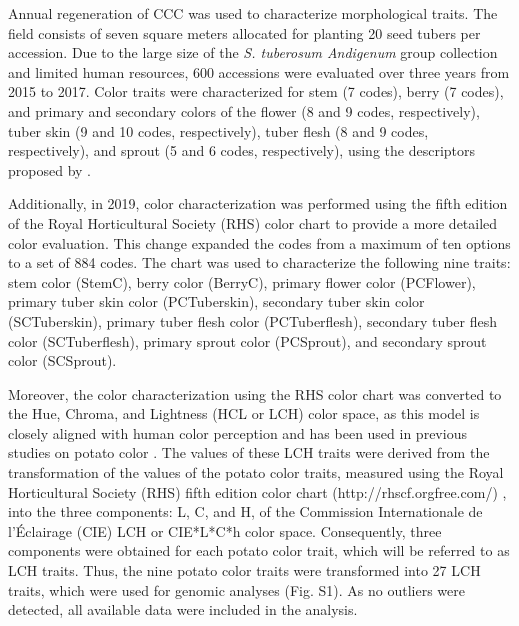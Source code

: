 \documentclass[pdflatex,sn-mathphys-ay]{sn-jnl}%
\begin{document}
Annual regeneration of CCC was used to characterize morphological traits. The field consists of seven square meters allocated for planting 20 seed tubers per accession. Due to the large size of the \textit{S. tuberosum Andigenum} group collection and limited human resources, 600 accessions were evaluated over three years from 2015 to 2017. Color traits were characterized for stem (7 codes), berry (7 codes), and primary and secondary colors of the flower (8 and 9 codes, respectively), tuber skin (9 and 10 codes, respectively), tuber flesh (8 and 9 codes, respectively), and sprout (5 and 6 codes, respectively), using the descriptors proposed by \cite{gomez2000guia}. 

Additionally, in 2019, color characterization was performed using the fifth edition of the Royal Horticultural Society (RHS) color chart \citep{voss2002royal} to provide a more detailed color evaluation. This change expanded the codes from a maximum of ten options to a set of 884 codes. The chart was used to characterize the following nine traits: stem color (StemC), berry color (BerryC), primary flower color (PCFlower), primary tuber skin color (PCTuberskin), secondary tuber skin color (SCTuberskin), primary tuber flesh color (PCTuberflesh), secondary tuber flesh color (SCTuberflesh), primary sprout color (PCSprout), and secondary sprout color (SCSprout). 






Moreover, the color characterization using the RHS color chart was converted to the Hue, Chroma, and Lightness (HCL or LCH) color space, as this model is closely aligned with human color perception and has been used in previous studies on potato color \citep{caraza2020image}.  The values of these LCH traits were derived from the transformation of the values of the potato color traits, measured using the Royal Horticultural Society (RHS) fifth edition color chart (http://rhscf.orgfree.com/) \citep{voss2002royal}, into the three components: L, C, and H, of the Commission Internationale de l'Éclairage (CIE) LCH or CIE{*}L{*}C{*}h color space. Consequently, three components were obtained for each potato color trait, which will be referred to as LCH traits. Thus, the nine potato color traits were transformed into 27 LCH traits, which were used for genomic analyses (Fig. S1). As no outliers were detected, all available data were included in the analysis. 
\end{document}
